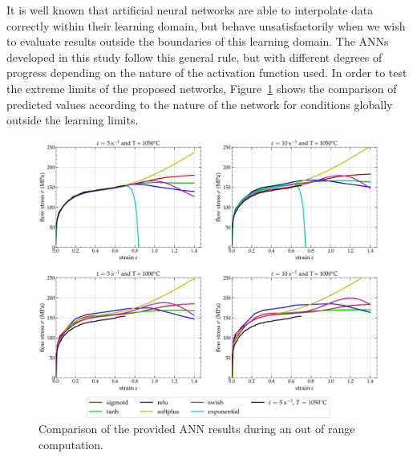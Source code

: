 \documentclass[algorithms,article,submit,pdftex,oneauthors]{Definitions/mdpi}
\begin{document}
It is well known that artificial neural networks are able to interpolate data correctly within their learning domain, but behave unsatisfactorily when we wish to evaluate results outside the boundaries of this learning domain.
The ANNs developed in this study follow this general rule, but with different degrees of progress depending on the nature of the activation function used.
In order to test the extreme limits of the proposed networks, Figure~\ref{fig:ANN-Extrapolation} shows the comparison of predicted values according to the nature of the network for conditions globally outside the learning limits.
\begin{figure}[h!]
\centering
\includegraphics[width=0.95\columnwidth]{Figures/Extrapolation}
\caption{Comparison of the provided ANN results during an out of range computation.}
\label{fig:ANN-Extrapolation}
\end{figure}
\end{document}
